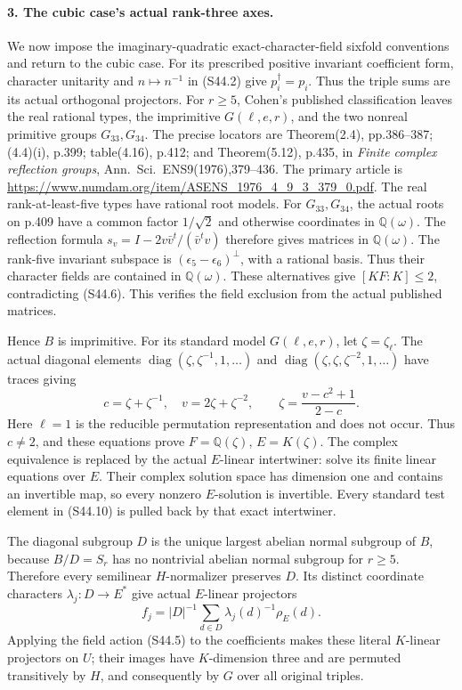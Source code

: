 \paragraph{3. The cubic case's actual rank-three axes.}
We now impose the imaginary-quadratic exact-character-field
sixfold conventions and return to the cubic case.
For its prescribed positive invariant coefficient form,
character unitarity and \(n\mapsto n^{-1}\) in (S44.2)
give \(p_i^\dagger=p_i\). Thus the triple sums are its
actual orthogonal projectors.
For \(r\ge5\), Cohen's published classification leaves the
real rational types, the imprimitive \(G(\ell,e,r)\), and
the two nonreal primitive groups \(G_{33},G_{34}\).
The precise locators are Theorem(2.4), pp.386--387;
(4.4)(i), p.399; table(4.16), p.412; and Theorem(5.12),
p.435, in \emph{Finite complex reflection groups},
Ann.\ Sci.\ ENS9(1976),379--436.
The primary article is
\url{https://www.numdam.org/item/ASENS_1976_4_9_3_379_0.pdf}.
The real rank-at-least-five types have rational root models.
For \(G_{33},G_{34}\), the actual roots on p.409 have a
common factor \(1/\sqrt2\) and otherwise coordinates in
\(\mathbb Q(\omega)\). The reflection formula
\(s_v=I-2v\bar v^t/(\bar v^tv)\) therefore gives matrices
in \(\mathbb Q(\omega)\). The rank-five invariant subspace
is \((\epsilon_5-\epsilon_6)^\perp\), with a rational basis.
Thus their character fields are contained in
\(\mathbb Q(\omega)\). These alternatives give
\([KF:K]\le2\), contradicting (S44.6). This verifies the
field exclusion from the actual published matrices.

Hence \(B\) is imprimitive. For its standard model
\(G(\ell,e,r)\), let \(\zeta=\zeta_\ell\).
The actual diagonal elements
\(\operatorname{diag}(\zeta,\zeta^{-1},1,\ldots)\) and
\(\operatorname{diag}(\zeta,\zeta,\zeta^{-2},1,\ldots)\)
have traces giving
\[
 c=\zeta+\zeta^{-1},\quad v=2\zeta+\zeta^{-2},\qquad
 \zeta=\frac{v-c^2+1}{2-c}.
 \tag{S44.10}
\]
Here \(\ell=1\) is the reducible permutation representation
and does not occur. Thus \(c\ne2\), and these equations
prove \(F=\mathbb Q(\zeta)\), \(E=K(\zeta)\). The
complex equivalence is replaced by the actual \(E\)-linear
intertwiner: solve its finite linear equations over \(E\).
Their complex solution space has dimension one and contains
an invertible map, so every nonzero \(E\)-solution is
invertible. Every standard test element in (S44.10) is
pulled back by that exact intertwiner.

The diagonal subgroup \(D\) is the unique largest abelian
normal subgroup of \(B\), because \(B/D=S_r\) has no
nontrivial abelian normal subgroup for \(r\ge5\).
Therefore every semilinear \(H\)-normalizer preserves \(D\).
Its distinct coordinate characters \(\lambda_j:D\to E^*\)
give actual \(E\)-linear projectors
\[
 f_j=|D|^{-1}\sum_{d\in D}\lambda_j(d)^{-1}\rho_E(d).
 \tag{S44.11}
\]
Applying the field action (S44.5) to the coefficients
makes these literal \(K\)-linear projectors on \(U\);
their images have \(K\)-dimension three and are permuted
transitively by \(H\), and consequently by \(G\) over
all original triples.

